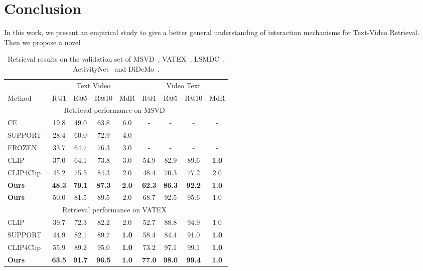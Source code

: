 \documentclass[runningheads]{llncs}
\begin{document}
\section{Conclusion}
\label{sec:conclusion}
In this work, we present an empirical study to give a better general understanding of interaction mechanisms for Text-Video Retrieval.
Then we propose a novel 
\begin{table}[H]
\centering
\caption{Retrieval results on the validation set of MSVD~\cite{msvd}, VATEX~\cite{vatex}, LSMDC~\cite{lsmdc}, ActivityNet~\cite{anet} and DiDeMo~\cite{didemo}.
}
\vspace*{-2mm}
\small
 \def\arraystretch{0.97}
\setlength{\tabcolsep}{3pt}
\begin{tabular}{lcccccccc}
\toprule
 & \multicolumn{4}{c}{Text Video}& \multicolumn{4}{c}{Video Text}\\
 \cmidrule(r){2-5}
 \cmidrule(r){6-9}
Method & R@1 & R@5& R@10 & MdR &  R@1 & R@5 & R@10 & MdR \\
\hline
\multicolumn{9}{c}{Retrieval performance on MSVD~\cite{msvd}} \\
\hline
CE~\cite{ce}&  19.8 &49.0 &63.8 &6.0& -& - & - &-\\
SUPPORT~\cite{support} &   28.4& 60.0& 72.9& 4.0& -& -& -& - \\
FROZEN\cite{frozen}&  33.7 &64.7& 76.3& 3.0& -& -& -& -  \\
CLIP~\cite{clip}&  37.0 & 64.1 & 73.8 & 3.0 & 54.9  & 82.9  & 89.6  &\textbf{1.0}\\
CLIP4Clip\cite{clip4clip}&  45.2  &75.5 & 84.3  &2.0 &  48.4 & 70.3 & 77.2 & 2.0 \\
\rowcolor{Gray}
\textbf{Ours}&   \textbf{48.3} & \textbf{79.1 }& \textbf{87.3}& \textbf{2.0} & \textbf{62.3} & \textbf{86.3} & \textbf{92.2 } & \textbf{1.0}  \\
\rowcolor{Gray}
\textbf{Ours}&   50.0  & 81.5 & 89.5 & 2.0 & 68.7   &92.5 & 95.6& 1.0   \\
\bottomrule
\multicolumn{9}{c}{Retrieval performance on VATEX~\cite{vatex}} \\
\hline
CLIP~\cite{clip}& 39.7 &72.3& 82.2& 2.0 &52.7 &88.8 &94.9 &1.0\\
SUPPORT~\cite{support} &   44.9& 82.1 &89.7 &\textbf{1.0}&58.4 &84.4 &91.0 &\textbf{1.0} \\
CLIP4Clip~\cite{clip4clip}&  55.9 &89.2& 95.0 &\textbf{1.0}&73.2 &97.1 &99.1 &\textbf{1.0}\\
\rowcolor{Gray}
\textbf{Ours}& \textbf{63.5} & \textbf{91.7} & \textbf{96.5} & \textbf{1.0}  &  \textbf{77.0}  & \textbf{98.0}   & \textbf{99.4}  & \textbf{1.0}\\

\end{tabular}
\end{table}
\end{document}
